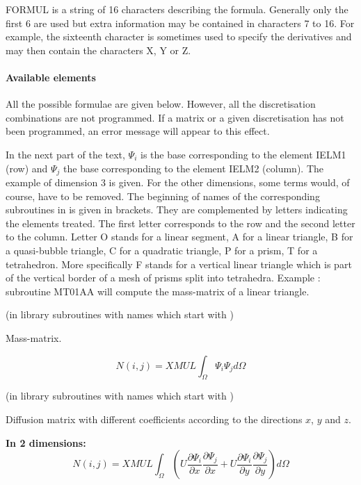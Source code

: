 FORMUL is a string of 16 characters describing the formula. Generally only the
first 6 are used but extra information may be contained in characters 7 to 16.
For example, the sixteenth character is sometimes used to specify the
derivatives and may then contain the characters X, Y or Z.

\paragraph{Available elements}

All the possible formulae are given below. However, all the discretisation
combinations are not programmed. If a matrix or a given discretisation has not
been programmed, an error message will appear to this effect.

In the next part of the text, $\Psi _{i} $ is the base corresponding to the
element IELM1 (row) and $\Psi _{j} $ the base corresponding to the element
IELM2 (column). The example of dimension 3 is given. For the other dimensions,
some terms would, of course, have to be removed. The beginning of names of the
corresponding subroutines in \bief is given in brackets. They are complemented
by letters indicating the elements treated. The first letter corresponds to the
row and the second letter to the column. Letter O stands for a linear segment,
A for a linear triangle, B for a quasi-bubble triangle, C for a quadratic
triangle, P for a prism, T for a tetrahedron. More specifically F stands for a
vertical linear triangle which is part of the vertical border of a mesh of
prisms split into tetrahedra. Example : subroutine MT01AA will compute the
mass-matrix of a linear triangle.


(in library \bief subroutines with names which start with )

Mass-matrix.

\[N(i,j)=XMUL \int _{\Omega }\Psi _{i} \Psi _{j} d\Omega  \]


(in library \bief subroutines with names which start with )

Diffusion matrix with different coefficients according to the directions $x$,
$y$ and $z$.

\textbf{In 2 dimensions:}
\[N(i,j)=XMUL \int _{\Omega }
(U\frac{\partial \Psi _{i} }{\partial x}
  \frac{\partial \Psi _{j} }{\partial x}
 +U\frac{\partial \Psi _{i} }{\partial y}
   \frac{\partial \Psi _{j} }{\partial y} )d\Omega  \]

